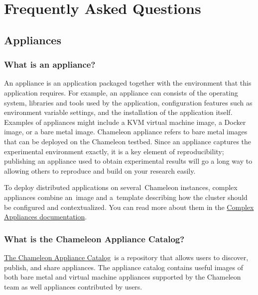 

\chapter{Frequently Asked Questions}\label{frequently-asked-questions}

\FILENAME

\section{Appliances}\label{appliances}

\subsection{What is an appliance?}\label{what-is-an-appliance}

An appliance is an application packaged together with the environment
that this application requires. For example, an appliance can consists
of the operating system, libraries and tools used by the application,
configuration features such as environment variable settings, and the
installation of the application itself. Examples of appliances might
include a KVM virtual machine image, a Docker image, or a bare metal
image. Chameleon appliance refers to bare metal images that can be
deployed on the Chameleon testbed. Since an appliance captures the
experimental environment exactly, it is a key element of
reproducibility; publishing an appliance used to obtain experimental
results will go a long way to allowing others to reproduce and build on
your research easily.

To deploy distributed applications on several~Chameleon instances,
complex appliances combine an~image and a~template describing how the
cluster should be configured and contextualized. You can read more about
them in the
\href{https://www.chameleoncloud.org/docs/complex-appliances/}{Complex
Appliances documentation}.

\subsection{What is the Chameleon Appliance Catalog?}\label{what-is-the-chameleon-appliance-catalog}

\href{https://www.chameleoncloud.org/appliances/}{The Chameleon
Appliance Catalog}~is a repository that allows users to discover,
publish, and share appliances. The appliance catalog contains useful
images of both bare metal and virtual machine appliances supported by
the Chameleon team as well appliances contributed by users.

